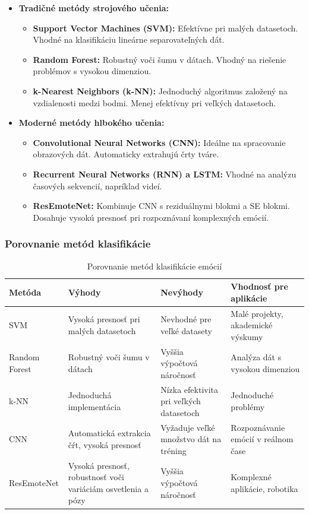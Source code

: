 \begin{itemize}
    \item \textbf{Tradičné metódy strojového učenia:}
    \begin{itemize}
        \item \textbf{Support Vector Machines (SVM):} 
        Efektívne pri malých datasetoch. Vhodné na klasifikáciu lineárne separovateľných dát.
        \item \textbf{Random Forest:} 
        Robustný voči šumu v dátach. Vhodný na riešenie problémov s vysokou dimenziou.
        \item \textbf{k-Nearest Neighbors (k-NN):} 
        Jednoduchý algoritmus založený na vzdialenosti medzi bodmi. Menej efektívny pri veľkých datasetoch.
    \end{itemize}
    
    \item \textbf{Moderné metódy hlbokého učenia:}
    \begin{itemize}
        \item \textbf{Convolutional Neural Networks (CNN):} 
        Ideálne na spracovanie obrazových dát. Automaticky extrahujú črty tváre.
        \item \textbf{Recurrent Neural Networks (RNN) a LSTM:} 
        Vhodné na analýzu časových sekvencií, napríklad videí.
        \item \textbf{ResEmoteNet:} 
        Kombinuje CNN s reziduálnymi blokmi a SE blokmi. Dosahuje vysokú presnosť pri rozpoznávaní komplexných emócií.
    \end{itemize}
\end{itemize}

\subsubsection{Porovnanie metód klasifikácie}
\begin{table}[H]
\centering
\begin{tabularx}{\textwidth}{|l|X|X|X|}
    \hline
    \textbf{Metóda} & \textbf{Výhody} & \textbf{Nevýhody} & \textbf{Vhodnosť pre aplikácie} \\ \hline
    SVM & Vysoká presnosť pri malých datasetoch & Nevhodné pre veľké datasety & Malé projekty, akademické výskumy \\ \hline
    Random Forest & Robustný voči šumu v dátach & Vyššia výpočtová náročnosť & Analýza dát s vysokou dimenziou \\ \hline
    k-NN & Jednoduchá implementácia & Nízka efektivita pri veľkých datasetoch & Jednoduché problémy \\ \hline
    CNN & Automatická extrakcia čŕt, vysoká presnosť & Vyžaduje veľké množstvo dát na tréning & Rozpoznávanie emócií v reálnom čase \\ \hline
    ResEmoteNet & Vysoká presnosť, robustnosť voči variáciám osvetlenia a pózy & Vyššia výpočtová náročnosť & Komplexné aplikácie, robotika \\ \hline
\end{tabularx}
\caption{Porovnanie metód klasifikácie emócií}
\end{table}

